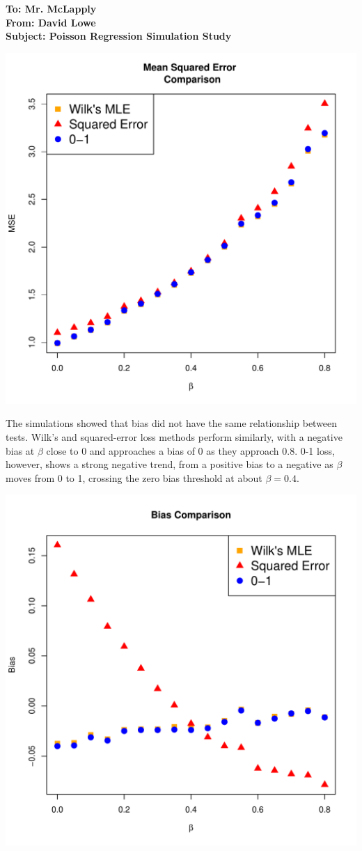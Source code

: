 \documentclass{letter}
\begin{document}
\begin{letter}{\large \bfseries To: Mr. McLapply \\ From: David Lowe \\ Subject: Poisson Regression Simulation Study}
\begin{center}
\includegraphics[scale=.45]{mse.pdf}
\end{center}

The simulations showed that bias did not have the same relationship between tests. Wilk's and squared-error loss methods perform similarly, with a negative bias at $\beta$ close to 0 and approaches a bias of 0 as they approach 0.8. 0-1 loss, however, shows a strong negative trend, from a positive bias to a negative as $\beta$ moves from 0 to 1, crossing the zero bias threshold at about $\beta=0.4$. 

\begin{center}
\includegraphics[scale=.45]{bias.pdf}
\end{center}


\end{letter}
\end{document}
